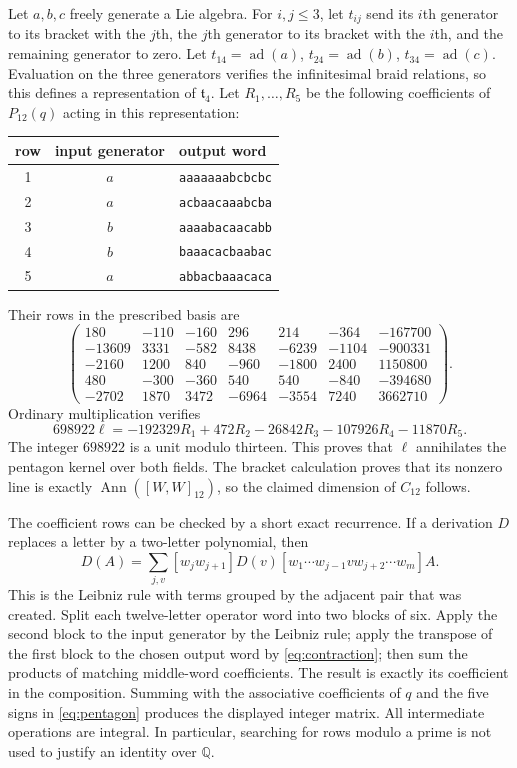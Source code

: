 \documentclass[11pt]{article}
\newcommand{\Q}{\mathbb Q}
\newcommand{\ad}{\operatorname{ad}}
\newcommand{\Ann}{\operatorname{Ann}}
\theoremstyle{definition}
\theoremstyle{remark}
\begin{document}
Let $a,b,c$ freely generate a Lie algebra.  For $i,j\leq3$, let $t_{ij}$
send its $i$th generator to its bracket with the $j$th, the $j$th generator
to its bracket with the $i$th, and the remaining generator to zero.
Let $t_{14}=\ad(a)$, $t_{24}=\ad(b)$, $t_{34}=\ad(c)$.
Evaluation on the three generators verifies the infinitesimal braid
relations, so this defines a representation of $\mathfrak t_4$.
Let $R_1,\ldots,R_5$ be the following coefficients of $P_{12}(q)$ acting
in this representation:
\begin{center}
\begin{tabular}{ccl}
\toprule
row&input generator&output word\\\midrule
1&$a$&\texttt{aaaaaaabcbcbc}\\
2&$a$&\texttt{acbaacaaabcba}\\
3&$b$&\texttt{aaaabacaacabb}\\
4&$b$&\texttt{baaacacbaabac}\\
5&$a$&\texttt{abbacbaaacaca}\\\bottomrule
\end{tabular}
\end{center}
Their rows in the prescribed basis are
\[
\begin{pmatrix}
180&-110&-160&296&214&-364&-167700\\
-13609&3331&-582&8438&-6239&-1104&-900331\\
-2160&1200&840&-960&-1800&2400&1150800\\
480&-300&-360&540&540&-840&-394680\\
-2702&1870&3472&-6964&-3554&7240&3662710
\end{pmatrix}.
\]
Ordinary multiplication verifies
\begin{equation}
698922\ell=-192329R_1+472R_2-26842R_3-107926R_4-11870R_5.
\label{eq:certificate12}
\end{equation}
The integer $698922$ is a unit modulo thirteen.  This proves that $\ell$
annihilates the pentagon kernel over both fields.  The bracket calculation
proves that its nonzero line is exactly $\Ann([W,W]_{12})$, so the
claimed dimension of $C_{12}$ follows.

The coefficient rows can be checked by a short exact recurrence.
If a derivation $D$ replaces a letter by a two-letter polynomial, then
\begin{equation}
[w]D(A)=\sum_{j,v}[w_jw_{j+1}]D(v)
 [w_1\cdots w_{j-1}v w_{j+2}\cdots w_m]A.
\label{eq:contraction}
\end{equation}
This is the Leibniz rule with terms grouped by the adjacent pair that
was created.  Split each twelve-letter operator word into two blocks of
six.  Apply the second block to the input generator by the Leibniz rule;
apply the transpose of the first block to the chosen output word by
\eqref{eq:contraction}; then sum the products of matching middle-word
coefficients.  The result is exactly its coefficient in the composition.
Summing with the associative coefficients of $q$ and the five signs in
\eqref{eq:pentagon} produces the displayed integer matrix.
All intermediate operations are integral.  In particular, searching for
rows modulo a prime is not used to justify an identity over $\Q$.
\end{document}
